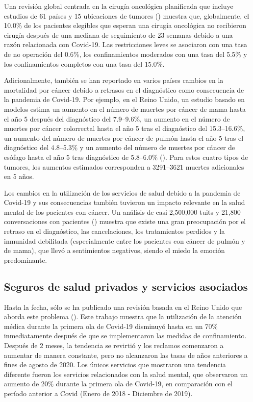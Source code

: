 \documentclass[12pt,twoside]{article} %
\begin{document}
Una revisión global centrada en la cirugía oncológica planificada que incluye estudios de 61 países y 15 ubicaciones de tumores (\cite{covidsurg_collaborative_effect_2021}) muestra que, globalmente, el 10.0\% de los pacientes elegibles que esperan una cirugía oncológica no recibieron cirugía después de una mediana de seguimiento de 23 semanas debido a una razón relacionada con Covid-19. Las restricciones leves se asociaron con una tasa de no operación del 0.6\%, los confinamientos moderados con una tasa del 5.5\% y los confinamientos completos con una tasa del 15.0\%.

Adicionalmente, también se han reportado en varios países cambios en la mortalidad por cáncer debido a retrasos en el diagnóstico como consecuencia de la pandemia de Covid-19. Por ejemplo, en el Reino Unido, un estudio basado en modelos estima un aumento en el número de muertes por cáncer de mama hasta el año 5 después del diagnóstico del 7.9–9.6\%, un aumento en el número de muertes por cáncer colorrectal hasta el año 5 tras el diagnóstico del 15.3–16.6\%, un aumento del número de muertes por cáncer de pulmón hasta el año 5 tras el diagnóstico del 4.8–5.3\% y un aumento del número de muertes por cáncer de esófago hasta el año 5 tras diagnóstico de 5.8–6.0\% (\cite{maringe_impact_2020}). Para estos cuatro tipos de tumores, los aumentos estimados corresponden a 3291–3621 muertes adicionales en 5 años.

Los cambios en la utilización de los servicios de salud debido a la pandemia de Covid-19 y sus consecuencias también tuvieron un impacto relevante en la salud mental de los pacientes con cáncer. Un análisis de casi 2,500,000 tuits y 21,800 conversaciones con pacientes (\cite{moraliyage_cancer_2021}) muestra que existe una gran preocupación por el retraso en el diagnóstico, las cancelaciones, los tratamientos perdidos y la inmunidad debilitada (especialmente entre los pacientes con cáncer de pulmón y de mama), que llevó a sentimientos negativos, siendo el miedo la emoción predominante. 

\subsection{Seguros de salud privados y servicios asociados}\label{sec:private}
Hasta la fecha, sólo se ha publicado una revisión basada en el Reino Unido que aborda este problema (\cite{howarth_trends_2021}). Este trabajo muestra que la utilización de la atención médica durante la primera ola de Covid-19 disminuyó hasta en un 70\% inmediatamente después de que se implementaron las medidas de confinamiento. Después de 2 meses, la tendencia se revirtió y los reclamos comenzaron a aumentar de manera constante, pero no alcanzaron las tasas de años anteriores a fines de agosto de 2020. Los únicos servicios que mostraron una tendencia diferente fueron los servicios relacionados con la salud mental, que observaron un aumento de 20\% durante la primera ola de Covid-19, en comparación con el período anterior a Covid (Enero de 2018 - Diciembre de 2019). 
\end{document}
